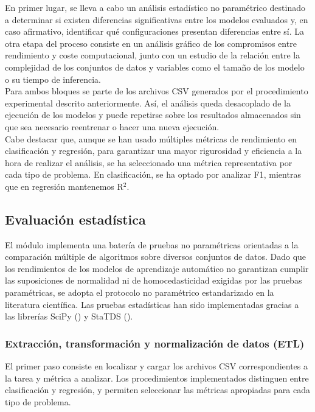 \documentclass[a4paper,12pt,twoside,final]{book}
\begin{document}
En primer lugar, se lleva a cabo un análisis estadístico no paramétrico destinado a determinar si existen diferencias
significativas entre los modelos evaluados y, en caso afirmativo, identificar qué configuraciones presentan diferencias
entre sí. La otra etapa del proceso consiste en un análisis gráfico de los compromisos entre rendimiento y coste
computacional, junto con un estudio de la relación entre la complejidad de los conjuntos de datos y variables como el
tamaño de los modelo o su tiempo de inferencia.\\

Para ambos bloques se parte de los archivos CSV generados por el procedimiento experimental descrito anteriormente. Así,
el análisis queda desacoplado de la ejecución de los modelos y puede repetirse sobre los resultados almacenados sin que
sea necesario reentrenar o hacer una nueva ejecución.\\

Cabe destacar que, aunque se han usado múltiples métricas de rendimiento en clasificación y regresión, para garantizar
una mayor rigurosidad y eficiencia a la hora de realizar el análisis, se ha seleccionado una métrica representativa por
cada tipo de problema. En clasificación, se ha optado por analizar F1, mientras que en regresión mantenemos R$^2$.

\subsection{Evaluación estadística}
El módulo  implementa una batería de pruebas no paramétricas orientadas a la comparación
múltiple de algoritmos sobre diversos conjuntos de datos. Dado que los rendimientos de los modelos de aprendizaje
automático no garantizan cumplir las suposiciones de normalidad ni de homocedasticidad exigidas por las pruebas
paramétricas, se adopta el protocolo no paramétrico estandarizado en la literatura científica. Las pruebas
estadísticas han sido implementadas gracias a las librerías SciPy () y StaTDS
().

\subsubsection{Extracción, transformación y normalización de datos (ETL)}
El primer paso consiste en localizar y cargar los archivos CSV correspondientes a la tarea y métrica a analizar. Los
procedimientos implementados distinguen entre clasificación y regresión, y permiten seleccionar las métricas apropiadas
para cada tipo de problema.\\
\end{document}
